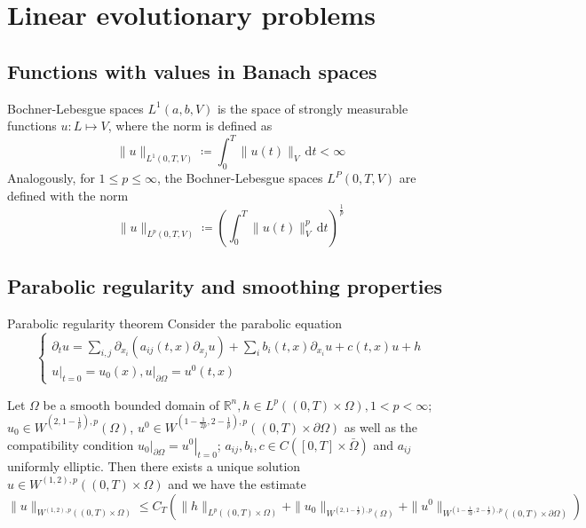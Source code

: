 \documentclass{report}
\begin{document}
\chapter{Linear evolutionary problems}

\section{Functions with values in Banach spaces}
\begin{definition}{Bochner-Lebesgue spaces}{}
    \(L^{1}(a, b, V)\) is the space of strongly measurable functions \(u : L \mapsto V\), where the norm is defined as 
    \[
        \|u\|_{L^{1}(0, T, V)} \coloneqq \int_{0}^{T} \|u(t)\|_{V} \,\mathrm{d}t < \infty  
    \] 
    Analogously, for \(1 \leq p \leq \infty\), the Bochner-Lebesgue spaces \(L^{P}(0, T, V)\) are defined with the norm
    \[
        \|u\|_{L^{p}(0, T, V)} \coloneqq \left(\int_{0}^{T} \|u(t)\|_{V}^{p} \,\mathrm{d}t\right)^{\frac{1}{p}}
    \]
\end{definition}

\section{Parabolic regularity and smoothing properties}
\begin{theorem}{Parabolic regularity theorem}{}
    Consider the parabolic equation
    \begin{equation*}
        \begin{cases*}
            \partial_{t}u = \sum_{i, j} \partial_{x_{i}}(a_{ij}(t, x)\partial_{x_{j}}u) + \sum_{i}b_{i}(t, x) \partial_{x_{i}}u + c(t, x)u + h \\
            \left. u \right|_{t = 0} = u_{0}(x), \left. u \right|_{\partial \Omega} = u^{0}(t, x)
        \end{cases*}
    \end{equation*}

    Let \(\Omega\) be a smooth bounded domain of \(\mathbb{R}^{n}, h \in L^{p}((0, T) \times \Omega), 1 < p < \infty\); \(u_{0} \in W^{(2, 1-\frac{1}{p}), p}(\Omega)\), \(u^{0} \in W^{(1-\frac{1}{2p}, 2-\frac{1}{p}), p}((0, T) \times \partial \Omega)\) as well as the compatibility condition \(\left. u_{0} \right|_{\partial \Omega} = \left. u^{0} \right|_{t = 0}\); \(a_{ij}, b_{i}, c \in C([0, T] \times \bar{\Omega})\) and \(a_{ij}\) uniformly elliptic. Then there exists a unique solution \(u \in W^{(1, 2), p}((0, T) \times \Omega)\) and we have the estimate
    \begin{equation*}
        \|u\|_{W^{(1, 2), p}((0, T) \times \Omega)} \leq C_{T}\left(\|h\|_{L^{p}((0, T) \times \Omega)} + \|u_{0}\|_{W^{\left(2, 1-\frac{1}{p}\right), p}(\Omega)} + \|u^{0}\|_{W^{\left(1-\frac{1}{2p}, 2-\frac{1}{p}\right), p}((0, T) \times \partial \Omega)}\right)
    \end{equation*}
\end{theorem}
\end{document}
